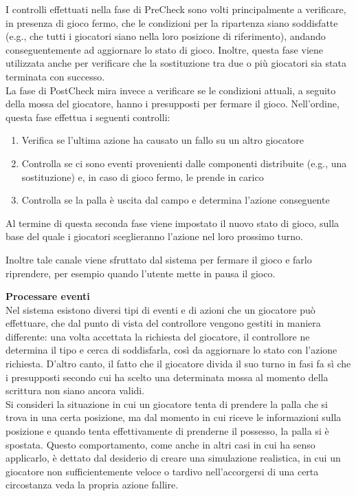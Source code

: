 I controlli effettuati nella fase di PreCheck sono volti principalmente a verificare, in presenza di gioco fermo, che le condizioni per la ripartenza siano soddisfatte (e.g., che tutti i giocatori siano nella loro posizione di riferimento), andando conseguentemente ad aggiornare lo stato di gioco. Inoltre, questa fase viene utilizzata anche per verificare che la sostituzione tra due o più giocatori sia stata terminata con successo.\\

La fase di PostCheck mira invece a verificare se le condizioni attuali, a seguito della mossa del giocatore, hanno i presupposti per fermare il gioco. Nell'ordine, questa fase effettua i seguenti controlli:

\begin{enumerate}
	\item Verifica se l'ultima azione ha causato un fallo su un altro giocatore
	\item Controlla se ci sono eventi provenienti dalle componenti distribuite (e.g., una sostituzione) e, in caso di gioco fermo, le prende in carico
	\item Controlla se la palla è uscita dal campo e determina l'azione conseguente
\end{enumerate}

Al termine di questa seconda fase viene impostato il nuovo stato di gioco, sulla base del quale i giocatori sceglieranno l'azione nel loro prossimo turno.

Inoltre tale canale viene sfruttato dal sistema per fermare il gioco e farlo riprendere, per esempio quando l'utente mette in pausa il gioco.

\textbf{Processare eventi}\\

Nel sistema esistono diversi tipi di eventi e di azioni che un giocatore può effettuare, che dal punto di vista del controllore vengono gestiti in maniera differente: una volta accettata la richiesta del giocatore, il controllore ne determina il tipo e cerca di soddisfarla, così da aggiornare lo stato con l'azione richiesta. D'altro canto, il fatto che il giocatore divida il suo turno in fasi fa sì che i presupposti secondo cui ha scelto una determinata mossa al momento della scrittura non siano ancora validi.\\

Si consideri la situazione in cui un giocatore tenta di prendere la palla che si trova in una certa posizione, ma dal momento in cui riceve le informazioni sulla posizione e quando tenta effettivamente di prenderne il possesso, la palla si è spostata. Questo comportamento, come anche in altri casi in cui ha senso applicarlo, è dettato dal desiderio di creare una simulazione realistica, in cui un giocatore non sufficientemente veloce o tardivo nell'accorgersi di una certa circostanza veda la propria azione fallire.\\

